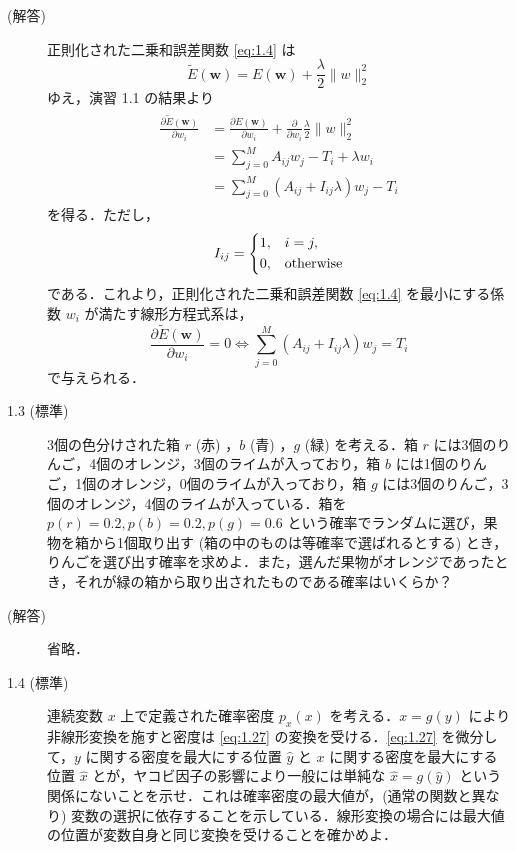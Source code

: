 \documentclass[uplatex,a4paper,oneside,openany,dvipdfmx]{jsarticle}
\numberwithin{equation}{section}
\theoremstyle{mystyle} %
\newcommand{\bs}[1]{\boldsymbol{#1}}
\newcommand{\norm}[1]{\|#1\|}
\begin{document}
\begin{description}
\item[(解答)] 正則化された二乗和誤差関数 \eqref{eq:1.4} は
\begin{equation}
    \widetilde{E}(\bs{w}) = E(\bs{w}) + \frac{\lambda}{2} \norm{w}_{2}^{2}
\end{equation}
ゆえ，演習 1.1 の結果より
\begin{align}
    \begin{aligned}
        \frac{\partial{\widetilde{E}(\bs{w})}}{\partial{w_{i}}} &= \frac{\partial{E(\bs{w})}}{\partial{w_{i}}} + \frac{\partial}{\partial{w_{i}}} \frac{\lambda}{2} \norm{w}_{2}^{2} \\
        &= \sum_{j=0}^{M} A_{ij}w_{j} - T_{i} + \lambda w_{i} \\
        &= \sum_{j=0}^{M} (A_{ij} + I_{ij}\lambda) w_{j} - T_{i}
    \end{aligned}
\end{align}
を得る．ただし，
\begin{equation}
    I_{ij} = \begin{dcases}
        1, & i=j, \\
        0, & \text{otherwise}
    \end{dcases}
\end{equation}
である．これより，正則化された二乗和誤差関数 \eqref{eq:1.4} を最小にする係数 $w_{i}$ が満たす線形方程式系は，
\begin{equation}
    \frac{\partial{\widetilde{E}(\bs{w})}}{\partial{w_{i}}} = 0 \iff \sum_{j=0}^{M} (A_{ij} + I_{ij}\lambda) w_{j} = T_{i}
\end{equation}
で与えられる．

\item[1.3 (標準)] 3個の色分けされた箱 $r$ (赤) ，$b$ (青) ，$g$ (緑) を考える．箱 $r$ には3個のりんご，4個のオレンジ，3個のライムが入っており，箱 $b$ には1個のりんご，1個のオレンジ，0個のライムが入っており，箱 $g$ には3個のりんご，3個のオレンジ，4個のライムが入っている．箱を $p(r) = 0.2, p(b) = 0.2, p(g) = 0.6$ という確率でランダムに選び，果物を箱から1個取り出す (箱の中のものは等確率で選ばれるとする) とき，りんごを選び出す確率を求めよ．また，選んだ果物がオレンジであったとき，それが緑の箱から取り出されたものである確率はいくらか？

\item[(解答)] 省略．

\item[1.4 (標準)]  連続変数 $x$ 上で定義された確率密度 $p_{x}(x)$ を考える．$x = g(y)$ により非線形変換を施すと密度は \eqref{eq:1.27} の変換を受ける．\eqref{eq:1.27} を微分して，$y$ に関する密度を最大にする位置 $\hat{y}$ と $x$ に関する密度を最大にする位置 $\hat{x}$ とが，ヤコビ因子の影響により一般には単純な $\hat{x} = g(\hat{y})$ という関係にないことを示せ．これは確率密度の最大値が，(通常の関数と異なり) 変数の選択に依存することを示している．線形変換の場合には最大値の位置が変数自身と同じ変換を受けることを確かめよ．


\end{description}
\end{document}

